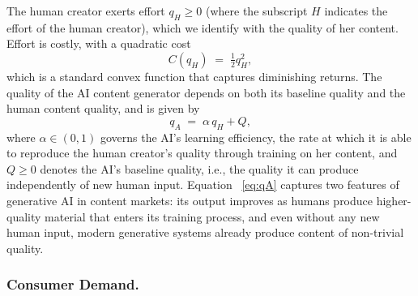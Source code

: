 The human creator exerts effort $q_H \geq 0$ (where the subscript $H$ indicates the effort of the human creator), which we identify with 
the quality of her content. Effort is costly, with a 
quadratic cost
\[
C(q_H) \;=\; \tfrac{1}{2}q_H^{2},
\]
which is a standard convex function that captures diminishing returns. The quality of the AI content 
generator depends on both its baseline quality and the human content quality, and is given by 
\begin{equation}\label{eq:qA}
q_A \;=\; \alpha\, q_H + Q,
\end{equation}
where $\alpha \in (0,1)$ governs the AI's  {learning efficiency},
the rate at which it is able to reproduce the human creator's 
quality through training on her content, and $Q \geq 0$ denotes the 
AI's  {baseline quality}, i.e., the quality it can produce 
independently of new human input. Equation ~\eqref{eq:qA} captures 
two features of generative AI in content markets: 
its output improves as humans produce higher-quality 
material that enters its training process, and even without any new human 
input, modern generative systems already produce content of 
non-trivial quality.

\subsubsection*{Consumer Demand.}

